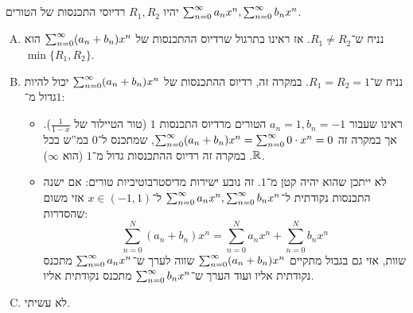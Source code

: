 \documentclass[]{../../../../tex/classes/homework}
\begin{document}
	\section{}
	יהיו $R_1, R_2$ רדיוסי התכנסות של הטורים $\sum_{n = 0}^{\infty} a_nx^{n}, \sum_{n = 0}^{\infty} b_nx^{n}$. 
	\begin{enumerate}[(A)]
		\item נניח ש־$R_1 \neq R_2$. אז ראינו בתרגול שרדיוס ההתכנסות של $\sum_{n = 0}^{\infty} (a_n + b_n)x^{n}$ הוא $\min\{R_1, R_2\}$. 
		\item נניח ש־$R_1 = R_2 = 1$. במקרה זה, רדיוס ההתכנסות של $\sum_{n = 0}^{\infty} (a_n + b_n)x^{n}$ יכול להיות גדול מ־$1$: 
		\begin{itemize}
			\item ראינו שעבור $a_n = 1, b_n = -1$ הטורים מרדיוס התכנסות $1$ (טור הטיילור של $\frac{1}{1 - x}$). אך במקרה זה $\sum_{n = 0}^{\infty} (a_n + b_n)x^{n} = \sum_{n = 0}^{\infty} 0 \cdot x^{n} = 0$, שמתכנס ל־$0$ במ''ש בכל $\mathbb{R}$. במקרה זה רדיוס ההתכנסות גדול מ־$1$ (הוא $\infty$). 
			\item לא ייתכן שהוא יהיה קטן מ־$1$. זה נובע ישירות מדיסטרבוטיביות טורים: אם ישנה התכנסות נקודתית ל־$\sum_{n = 0}^{\infty} a_n x^{n}, \sum_{n = 0}^{\infty} b_n x^{n}$ ל־$x \in (-1, 1)$ אזי משום שהסדרות: 
			\[ \sum^{N}_{n = 0}(a_n + b_n)x^{n} = \sum^{N}_{n = 0}a_nx^{n} + \sum^{N}_{n = 0}b_nx^{n} \]
			שוות, אזי גם בגבול מתקיים $\sum_{n = 0}^{\infty} (a_n + b_n)x^{n}$ שווה לערך ש־$\sum_{n = 0}^{\infty} a_nx^{n}$ מתכנס נקודתית אליו ועוד הערך ש־$\sum_{n = 0}^{\infty} b_n x^{n}$ מתכנס נקודתית אליו. 
		\end{itemize}
		\item לא עשיתי. 
	\end{enumerate}
	
	
	
	\ndoc
\end{document}
